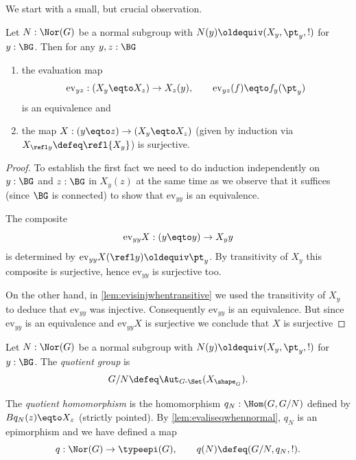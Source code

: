 We start with a small, but crucial observation.
\begin{lemma}
  \label{lem:evaliseqwhennormal}
  Let $N:\Nor(G)$ be a normal subgroup with $N(y)\oldequiv (X_y,\pt_y,!)$ for $y:\BG$.
  Then for any $y,z:\BG$
  \begin{enumerate}
  \item the evaluation map
$$\mathrm{ev}_{yz}:(X_y\eqto X_z)\to X_z(y),\qquad \mathrm{ev}_{yz}(f)\eqto f_y(\pt_y)$$
is an equivalence and
  \item  the map $X:(y\eqto z)\to(X_y\eqto X_z)$ (given by induction via $X_{\refl y}\defeq\refl{X_y}$) is surjective.
  \end{enumerate}
\end{lemma}
\begin{proof}
To establish the first fact we need to do induction independently on $y:\BG$ and $z:\BG$ in $X_y(z)$ at the same time as we observe that it suffices (since $\BG$ is connected) to show that $\mathrm{ev}_{yy}$ is an equivalence.

The composite
$$\mathrm{ev}_{yy}X:(y\eqto y)\to X_yy$$ is determined by $\mathrm{ev}_{yy}X(\refl y)\oldequiv \pt_y$.
By transitivity of $X_y$ this composite is surjective, hence $\mathrm{ev}_{yy}$ is surjective too.

On the other hand, in  \cref{lem:evisinjwhentransitive} we used the transitivity of $X_y$ to deduce that $\mathrm{ev}_{yy}$ was injective.  Consequently $\mathrm{ev}_{yy}$ is an equivalence.  But since $\mathrm{ev}_{yy}$ is an equivalence and $\mathrm{ev}_{yy}X$ is surjective we conclude that $X$ is surjective
\end{proof}
\begin{definition}
\label{def:normalquotient}
Let $N:\Nor(G)$ be a normal subgroup with $N(y)\oldequiv (X_y,\pt_y,!)$ for $y:\BG$.  The \emph{quotient group} is
$$G/N\defeq\Aut_{G\text{-}\Set}(X_{\sh_G}).
$$

The \emph{quotient homomorphism} is the homomorphism $q_N:\Hom(G,G/N)$  defined by $Bq_N(z)\eqto X_z$ (strictly pointed).
By \cref{lem:evaliseqwhennormal}, $q_N$ is an epimorphism and we have defined a map
$$q:\Nor(G)\to\typeepi(G),\qquad q(N)\defeq(G/N,q_N,!).$$
\end{definition}

